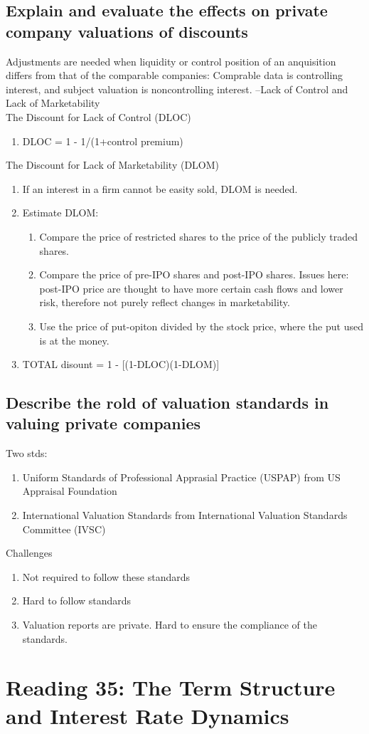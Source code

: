 \documentclass{article}
\newcommand{\be}{\begin{enumerate}}
\newcommand{\ee}{\end{enumerate}}
\begin{document}
\subsection{Explain and evaluate the effects on private company valuations of discounts
}
Adjustments are needed when liquidity or control position of an anquisition differs from 
that of the comparable companies: Comprable data is controlling interest, and subject valuation
is noncontrolling interest. --Lack of Control and Lack of Marketability
\\The Discount for Lack of Control (DLOC)
\be
    \item DLOC = 1 - 1/(1+control premium)
\ee
The Discount for Lack of Marketability (DLOM)
\be
    \item If an interest in a firm cannot be easity sold, DLOM is needed.\
    \item Estimate DLOM:
        \be
            \item Compare the price of restricted shares to the price of the
                publicly traded shares.
            \item Compare the price of pre-IPO shares and post-IPO shares. Issues here:
                post-IPO price are thought to have more certain cash flows and lower risk,
                therefore not purely reflect changes in marketability.
            \item Use the price of put-opiton divided by the stock price, where the put
                used is at the money.
        \ee
    \item TOTAL disount = 1 - [(1-DLOC)(1-DLOM)]
\ee
\subsection{Describe the rold of valuation standards in valuing private companies}
Two stds:
\be
    \item Uniform Standards of Professional Apprasial Practice (USPAP) from US Appraisal Foundation 
    \item International Valuation Standards from International Valuation Standards Committee (IVSC)
\ee
Challenges
\be
    \item Not required to follow these standards
    \item Hard to follow standards
    \item Valuation reports are private. Hard to ensure the compliance of the standards.
\ee

\section{Reading 35: The Term Structure and Interest Rate Dynamics}
\end{document}
